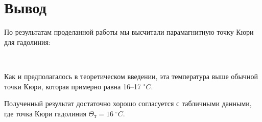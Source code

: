 \documentclass[12pt]{kiarticle}
\begin{document}
\section{Вывод}

По результатам проделанной работы мы высчитали парамагнитную точку Кюри для гадолиния:

\begin{center}
	{} \\
\end{center} 

Как и предполагалось в теоретическом введении, эта температура выше обычной точки Кюри, которая примерно равна 16--17 $ ^\circ C $. 

Полученный результат достаточно хорошо согласуется с табличными данными, где точка Кюри гадолиния $ \Theta_т = 16 \; ^\circ C $.
\end{document}
